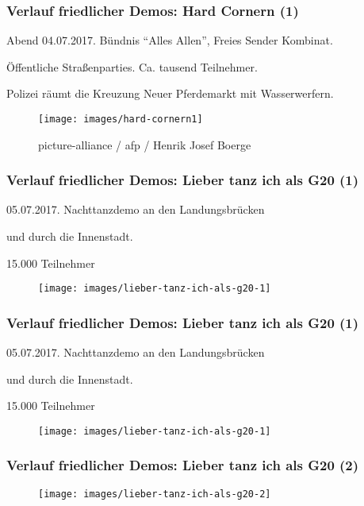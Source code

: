 \documentclass[]{beamer}
\begin{document}
	\begin{frame}
	\frametitle{Verlauf friedlicher Demos: Hard Cornern (1)}
		Abend 04.07.2017. Bündnis \enquote{Alles Allen}, Freies Sender Kombinat.\par
		Öffentliche Straßenparties. Ca. tausend Teilnehmer.\par
		Polizei räumt die Kreuzung Neuer Pferdemarkt mit Wasserwerfern.
	\begin{figure}		
		\renewcommand{\figurename}{Foto} 
		\texttt{[image: images/hard-cornern1]}
		\caption{picture-alliance / afp / Henrik Josef Boerge}
	\end{figure}
\end{frame}

	\begin{frame}
	\frametitle{Verlauf friedlicher Demos: Lieber tanz ich als G20 (1)}
		05.07.2017. Nachttanzdemo an den Landungsbrücken\par
		und durch die Innenstadt.\par
		15.000 Teilnehmer
	\begin{figure}
		\renewcommand{\figurename}{Foto} 
		\texttt{[image: images/lieber-tanz-ich-als-g20-1]}
		\caption{}
	\end{figure}
\end{frame}

	\begin{frame}
	\frametitle{Verlauf friedlicher Demos: Lieber tanz ich als G20 (1)}
		05.07.2017. Nachttanzdemo an den Landungsbrücken\par
		und durch die Innenstadt.\par
		15.000 Teilnehmer
	\begin{figure}
		\renewcommand{\figurename}{Foto} 
		\texttt{[image: images/lieber-tanz-ich-als-g20-1]}
		\caption{}
	\end{figure}
\end{frame}

	\begin{frame}
	\frametitle{Verlauf friedlicher Demos: Lieber tanz ich als G20 (2)}
	\begin{figure}
		\renewcommand{\figurename}{Foto} 
		\texttt{[image: images/lieber-tanz-ich-als-g20-2]}
		\caption{}
	\end{figure}
\end{frame}
\end{document}
